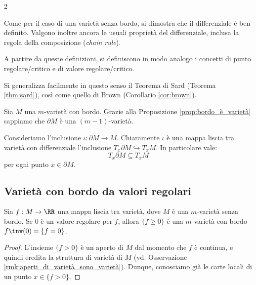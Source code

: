 \begin{multicols*}{2}
    \begin{remark}
        Come per il caso di una varietà senza bordo, si dimostra che il
        differenziale è ben definito. Valgono inoltre ancora le usuali
        proprietà del differenziale, inclusa la regola della composizione
        (\textit{chain rule}).
    \end{remark}

    \begin{remark}
        A partire da queste definizioni, si definiscono in modo analogo i
        concetti di punto regolare/critico e di valore regolare/critico. \smallskip

        Si generalizza facilmente in questo senso
        il Teorema di Sard (Teorema \ref{thm:sard}), così come quello di
        Brown (Corollario \ref{cor:brown}).
    \end{remark}

    \begin{remark}
        Sia $M$ una $m$-varietà con bordo. Grazie alla Proposizione \ref{prop:bordo_è_varietà}
        sappiamo che $\partial M$ è una $(m-1)$-varietà. \smallskip

        Consideriamo l'inclusione $\iota : \partial M \to M$. Chiaramente $\iota$ è una
        mappa liscia tra varietà con differenziale l'inclusione $T_x \partial M \hookrightarrow T_x M$.
        In particolare vale:
        \[
            \boxed{T_x \partial M \subseteq T_x M}
        \]
        per ogni punto $x \in \partial M$.
    \end{remark}

    \subsection{Varietà con bordo da valori regolari}

    \begin{theorem} \label{thm:varietà_bordata_da_valore_regolare_su_R}
        Sia $f : M \to \RR$ una mappa liscia tra varietà, dove $M$ è una $m$-varietà senza bordo. Se
        $0$ è un valore regolare per $f$, allora $\{ f \geq 0 \}$ è una
        $m$-varietà con bordo $f\inv(0) = \{f = 0\}$.
    \end{theorem}

    \begin{proof}
        L'insieme $\{f > 0\}$ è un aperto di $M$ dal momento che $f$ è continua, e quindi
        eredita la struttura di varietà di $M$ (vd. Osservazione \ref{rmk:aperti_di_varietà_sono_varietà}).
        Dunque, conosciamo già le carte locali di un punto $x \in \{f > 0\}$. \smallskip


\end{proof}
\end{multicols*}
